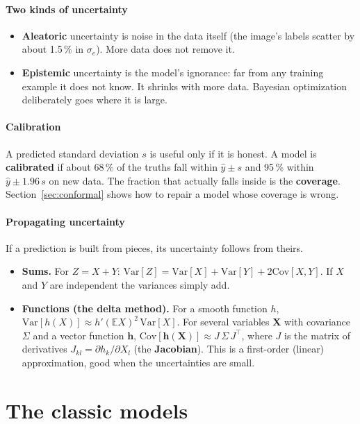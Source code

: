\documentclass[11pt]{article}
\newcommand{\E}{\mathbb{E}}
\newcommand{\Var}{\mathrm{Var}}
\newcommand{\Cov}{\mathrm{Cov}}
\begin{document}
\subsection{Two kinds of uncertainty}
\begin{itemize}
\item \textbf{Aleatoric} uncertainty is noise in the data itself (the image's labels scatter by about 1.5\,\% in $\sigma_e$).
  More data does not remove it.
\item \textbf{Epistemic} uncertainty is the model's ignorance: far from any training example it does not know. It shrinks with more
  data. Bayesian optimization deliberately goes where it is large.
\end{itemize}

\subsection{Calibration}
A predicted standard deviation $s$ is useful only if it is honest. A model is \textbf{calibrated} if about 68\,\% of the truths fall
within $\hat y \pm s$ and 95\,\% within $\hat y \pm 1.96\,s$ on new data. The fraction that actually falls inside is the
\textbf{coverage}. Section~\ref{sec:conformal} shows how to repair a model whose coverage is wrong.

\subsection{Propagating uncertainty}
If a prediction is built from pieces, its uncertainty follows from theirs.
\begin{itemize}
\item \textbf{Sums.} For $Z = X + Y$: $\Var[Z] = \Var[X] + \Var[Y] + 2\Cov[X, Y]$. If $X$ and $Y$ are independent the variances simply
  add.
\item \textbf{Functions (the delta method).} For a smooth function $h$, $\Var[h(X)] \approx h'(\E X)^2\,\Var[X]$. For several variables
  $\bm X$ with covariance $\Sigma$ and a vector function $\bm h$, $\Cov[\bm h(\bm X)] \approx J\,\Sigma\,J^\top$, where $J$ is the
  matrix of derivatives $J_{kl} = \partial h_k/\partial X_l$ (the \textbf{Jacobian}). This is a first-order (linear) approximation,
  good when the uncertainties are small.
\end{itemize}

\part{The classic models}
\end{document}
